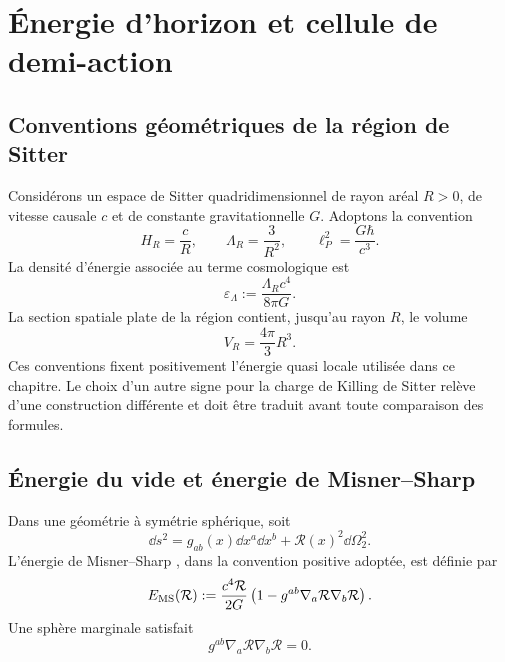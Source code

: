 \section{Énergie d’horizon et cellule de demi-action}
\label{rm:chap:horizonte-media-accion}

\subsection{Conventions géométriques de la région de Sitter}

Considérons un espace de Sitter quadridimensionnel de rayon aréal \(R>0\), de vitesse causale \(c\) et de constante gravitationnelle \(G\). Adoptons la convention
\begin{equation}
 H_R=\frac cR,
 \qquad
 \Lambda_R=\frac3{R^2},
 \qquad
 \ell_P^2=\frac{G\hbar}{c^3}.
 \label{rm:eq:horizon-ds-conventions}
\end{equation}
La densité d’énergie associée au terme cosmologique est
\begin{equation}
 \varepsilon_\Lambda
 :=\frac{\Lambda_Rc^4}{8\pi G}.
 \label{rm:eq:horizon-vacuum-density}
\end{equation}
La section spatiale plate de la région contient, jusqu’au rayon \(R\), le volume
\begin{equation}
 V_R=\frac{4\pi}{3}R^3.
 \label{rm:eq:horizon-flat-volume}
\end{equation}
Ces conventions fixent positivement l’énergie quasi locale utilisée dans ce chapitre. Le choix d’un autre signe pour la charge de Killing de Sitter relève d’une construction différente et doit être traduit avant toute comparaison des formules.

\subsection{Énergie du vide et énergie de Misner--Sharp}

Dans une géométrie à symétrie sphérique, soit
\begin{equation}
 \dd s^2=g_{ab}(x)\dd x^a\dd x^b
 +\mathcal R(x)^2\dd\Omega_2^2.
 \label{rm:eq:horizon-spherical-metric}
\end{equation}
L’énergie de Misner--Sharp \cite{rm:MisnerSharp1964}, dans la convention positive adoptée, est définie par
\begin{equation}
 E_{\rm MS}(\mathcal R)
 :=\frac{c^4\mathcal R}{2G}
 \left(1-g^{ab}\nabla_a\mathcal R\nabla_b\mathcal R\right).
 \label{rm:eq:horizon-Misner-Sharp}
\end{equation}
Une sphère marginale satisfait
\begin{equation}
 g^{ab}\nabla_a\mathcal R\nabla_b\mathcal R=0.
 \label{rm:eq:horizon-marginal-sphere}
\end{equation}

